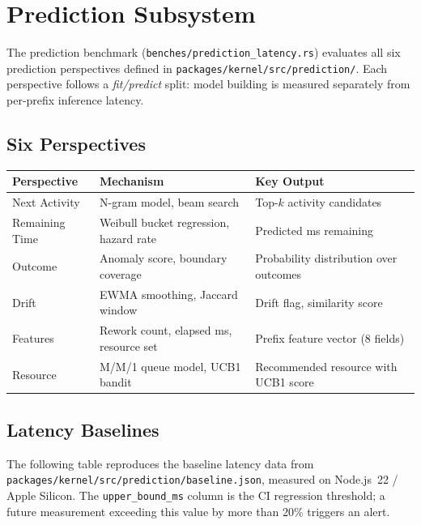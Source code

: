 \documentclass[11pt,a4paper]{article}
\begin{document}
\section{Prediction Subsystem}
\label{sec:prediction}

The prediction benchmark (\texttt{benches/prediction\_latency.rs})
evaluates all six prediction perspectives defined in
\texttt{packages/kernel/src/prediction/}. Each perspective follows a
\emph{fit/predict} split: model building is measured separately from
per-prefix inference latency.

\subsection{Six Perspectives}

\begin{center}
\begin{tabular}{@{}llp{5.5cm}@{}}
\toprule
\textbf{Perspective} & \textbf{Mechanism} & \textbf{Key Output} \\
\midrule
Next Activity & N-gram model, beam search & Top-$k$ activity candidates \\
Remaining Time & Weibull bucket regression, hazard rate &
  Predicted ms remaining \\
Outcome & Anomaly score, boundary coverage &
  Probability distribution over outcomes \\
Drift & EWMA smoothing, Jaccard window &
  Drift flag, similarity score \\
Features & Rework count, elapsed ms, resource set &
  Prefix feature vector (8 fields) \\
Resource & M/M/1 queue model, UCB1 bandit &
  Recommended resource with UCB1 score \\
\bottomrule
\end{tabular}
\end{center}

\subsection{Latency Baselines}

The following table reproduces the baseline latency data from
\texttt{packages/kernel/src/prediction/baseline.json}, measured on
Node.js~22 / Apple Silicon. The \texttt{upper\_bound\_ms} column is the
CI regression threshold; a future measurement exceeding this value by
more than 20\% triggers an alert.
\end{document}
